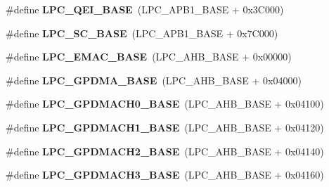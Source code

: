 \begin{DoxyCompactItemize}
\item 
\hypertarget{group___l_p_c17xx___system_ga80fa25b18324c10c8e5c26893e6f0a67}{\#define {\bfseries \-L\-P\-C\-\_\-\-Q\-E\-I\-\_\-\-B\-A\-S\-E}~(\-L\-P\-C\-\_\-\-A\-P\-B1\-\_\-\-B\-A\-S\-E + 0x3\-C000)}\label{group___l_p_c17xx___system_ga80fa25b18324c10c8e5c26893e6f0a67}

\item 
\hypertarget{group___l_p_c17xx___system_gadb3d235d9617660037e1115ee0ad2c3a}{\#define {\bfseries \-L\-P\-C\-\_\-\-S\-C\-\_\-\-B\-A\-S\-E}~(\-L\-P\-C\-\_\-\-A\-P\-B1\-\_\-\-B\-A\-S\-E + 0x7\-C000)}\label{group___l_p_c17xx___system_gadb3d235d9617660037e1115ee0ad2c3a}

\item 
\hypertarget{group___l_p_c17xx___system_gaab3f5a2a26c956606a43fc437007aec6}{\#define {\bfseries \-L\-P\-C\-\_\-\-E\-M\-A\-C\-\_\-\-B\-A\-S\-E}~(\-L\-P\-C\-\_\-\-A\-H\-B\-\_\-\-B\-A\-S\-E  + 0x00000)}\label{group___l_p_c17xx___system_gaab3f5a2a26c956606a43fc437007aec6}

\item 
\hypertarget{group___l_p_c17xx___system_ga51ba8e3f33730fa2b78be3f892d8c278}{\#define {\bfseries \-L\-P\-C\-\_\-\-G\-P\-D\-M\-A\-\_\-\-B\-A\-S\-E}~(\-L\-P\-C\-\_\-\-A\-H\-B\-\_\-\-B\-A\-S\-E  + 0x04000)}\label{group___l_p_c17xx___system_ga51ba8e3f33730fa2b78be3f892d8c278}

\item 
\hypertarget{group___l_p_c17xx___system_ga08781dde70e77f12630a885aeb555aaf}{\#define {\bfseries \-L\-P\-C\-\_\-\-G\-P\-D\-M\-A\-C\-H0\-\_\-\-B\-A\-S\-E}~(\-L\-P\-C\-\_\-\-A\-H\-B\-\_\-\-B\-A\-S\-E  + 0x04100)}\label{group___l_p_c17xx___system_ga08781dde70e77f12630a885aeb555aaf}

\item 
\hypertarget{group___l_p_c17xx___system_gafef63f5c3c6c206c3f3295ba3abf303a}{\#define {\bfseries \-L\-P\-C\-\_\-\-G\-P\-D\-M\-A\-C\-H1\-\_\-\-B\-A\-S\-E}~(\-L\-P\-C\-\_\-\-A\-H\-B\-\_\-\-B\-A\-S\-E  + 0x04120)}\label{group___l_p_c17xx___system_gafef63f5c3c6c206c3f3295ba3abf303a}

\item 
\hypertarget{group___l_p_c17xx___system_ga1c607916ebf4fa23ddefd37675366b5d}{\#define {\bfseries \-L\-P\-C\-\_\-\-G\-P\-D\-M\-A\-C\-H2\-\_\-\-B\-A\-S\-E}~(\-L\-P\-C\-\_\-\-A\-H\-B\-\_\-\-B\-A\-S\-E  + 0x04140)}\label{group___l_p_c17xx___system_ga1c607916ebf4fa23ddefd37675366b5d}

\item 
\hypertarget{group___l_p_c17xx___system_ga85913a69e6267017d35d98b24b9c5aee}{\#define {\bfseries \-L\-P\-C\-\_\-\-G\-P\-D\-M\-A\-C\-H3\-\_\-\-B\-A\-S\-E}~(\-L\-P\-C\-\_\-\-A\-H\-B\-\_\-\-B\-A\-S\-E  + 0x04160)}\label{group___l_p_c17xx___system_ga85913a69e6267017d35d98b24b9c5aee}


\end{DoxyCompactItemize}
